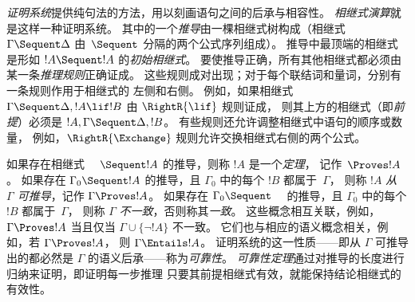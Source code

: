 \emph{证明系统}提供纯句法的方法，用以刻画语句之间的后承与相容性。
\emph{相继式演算}就是这样一种证明系统。
其中的一个\emph{推导}由一棵相继式树构成（相继式 $\Gamma \Sequent \Delta$
由~$\Sequent$ 分隔的两个公式序列组成）。
推导中最顶端的相继式是形如 $!A \Sequent !A$ 的\emph{初始相继式}。
要使推导正确，所有其他相继式都必须由某一条\emph{推理规则}正确证成。
这些规则成对出现；对于每个联结词和量词，分别有一条规则作用于相继式的
左侧和右侧。
例如，如果相继式 $\Gamma \Sequent \Delta, !A \lif !B$ 由
$\RightR{\lif}$ 规则证成，
则其上方的相继式（即\emph{前提}）必须是 $!A, \Gamma \Sequent \Delta, !B$。
有些规则还允许调整相继式中语句的顺序或数量，
例如，$\RightR{\Exchange}$ 规则允许交换相继式右侧的两个公式。

如果存在相继式 $\quad \Sequent !A$ 的推导，则称 $!A$ 是一个\emph{定理}，
记作~$\Proves !A$。
如果存在 $\Gamma_0 \Sequent !A$ 的推导，且 $\Gamma_0$ 中的每个 $!B$
都属于~$\Gamma$，
则称 $!A$ \emph{从~$\Gamma$ 可推导}，记作 $\Gamma \Proves !A$。
如果存在 $\Gamma_0 \Sequent \quad$ 的推导，且 $\Gamma_0$ 中的每个 $!B$
都属于~$\Gamma$，
则称 $\Gamma$ \emph{不一致}，否则称其\emph{一致}。
这些概念相互关联，例如，$\Gamma \Proves !A$ 当且仅当
$\Gamma \cup \{\lnot !A\}$ 不一致。
它们也与相应的语义概念相关，例如，若 $\Gamma \Proves !A$，
则 $\Gamma \Entails !A$。
证明系统的这一性质——即从 $\Gamma$ 可推导出的都必然是 $\Gamma$
的语义后承——称为\emph{可靠性}。
\emph{可靠性定理}通过对推导的长度进行归纳来证明，即证明每一步推理
只要其前提相继式有效，就能保持结论相继式的有效性。